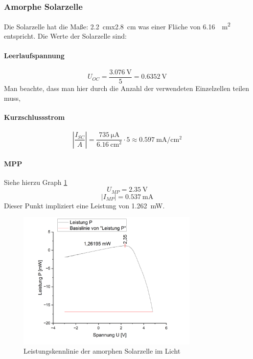 \documentclass[12pt,a4paper,ngerman]{report}
\begin{document}
		
		\subsubsection{Amorphe Solarzelle}
		Die Solarzelle hat die Maße: \qty{2,2}{\centi\m}x\qty{2,8}{\centi\m} was einer Fläche von \qty{6,16}{\centi\square\metre} entspricht. Die Werte der Solarzelle sind:
		
		\paragraph{Leerlaufspannung}
		\[	U_{OC} = \frac{\qty{3,076}{\volt}}{5} = \qty{0,6352}{\volt} \]
		Man beachte, dass man hier durch die Anzahl der verwendeten Einzelzellen teilen muss,
		
		\paragraph{Kurzschlussstrom}
		$$\left|\frac{I_{SC}}{A}\right|=\frac{\qty{735}{\micro\ampere}}{\qty{6,16}{\centi\square\metre}}\cdot 5  \approx\qty{0,597}{\milli\ampere\per\centi\square\metre}$$
		
		\paragraph{MPP} Siehe hierzu Graph \ref{fig:Leistamorphhell}
		$$U_{MP}=\qty{2,35}{\volt}$$ $$\vert I_{MP}\vert=\qty{0,537}{\milli\ampere}$$ 
		Dieser Punkt impliziert eine Leistung von \qty{1,262}{\milli\watt}.
		
		\begin{figure}
			\centering
			\includegraphics[width=0.8\textwidth]{Origin/LeistungAmorph.png}
			\caption{Leistungskennlinie der amorphen Solarzelle im Licht}
			\label{fig:Leistamorphhell}
		\end{figure}
		
\end{document}
